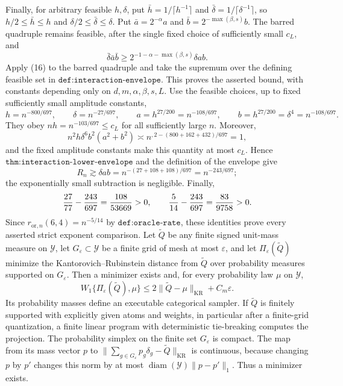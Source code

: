 Finally, for arbitrary feasible \(h,\delta\), put \(\bar h=1/\lceil h^{-1}\rceil\) and \(\bar\delta=1/\lceil\delta^{-1}\rceil\), so \(h/2\leq\bar h\leq h\) and \(\delta/2\leq\bar\delta\leq\delta\).  Put \(\bar a=2^{-\alpha}a\) and \(\bar b=2^{-\max(\beta,s)}b\).  The barred quadruple remains feasible, after the single fixed choice of sufficiently small \(c_L\), and
\[
 \bar\delta\bar a\bar b
 \geq2^{-1-\alpha-\max(\beta,s)}\delta ab.
\]
Apply (16) to the barred quadruple and take the supremum over the defining feasible set in \(\texttt{def:interaction-envelope}\).  This proves the asserted bound, with constants depending only on \(d,m,\alpha,\beta,s,L\).
Use the feasible choices, up to fixed sufficiently small amplitude constants,
\[
 h=n^{-800/697},\qquad \delta=n^{-27/697},\qquad
 a=h^{27/200}=n^{-108/697},\qquad
 b=h^{27/200}=\delta^4=n^{-108/697}.
\]
They obey \(nh=n^{-103/697}\leq c_L\) for all sufficiently large \(n\).  Moreover,
\[
 n^2h\delta^6b^2(a^2+b^2)
 \asymp n^{,2-(800+162+432)/697}=1,
\]
and the fixed amplitude constants make this quantity at most \(c_L\).  Hence \(\texttt{thm:interaction-lower-envelope}\) and the definition of the envelope give
\[
 R_n\gtrsim \delta ab=n^{-(27+108+108)/697}=n^{-243/697};
\]
the exponentially small subtraction is negligible.  Finally,
\[
 {27\over77}-{243\over697}={108\over53669}>0,
 \qquad
 {5\over14}-{243\over697}={83\over9758}>0.
\]
Since \(r_{\mathrm{or},n}(6,4)=n^{-5/14}\) by \(\texttt{def:oracle-rate}\), these identities prove every asserted strict exponent comparison.
Let \(\widetilde Q\) be any finite signed unit-mass measure on \(\mathcal Y\), let \(G_{\varepsilon}\subset\mathcal Y\) be a finite grid of mesh at most \(\varepsilon\), and let \(\Pi_{\varepsilon}(\widetilde Q)\) minimize the Kantorovich--Rubinstein distance from \(\widetilde Q\) over probability measures supported on \(G_{\varepsilon}\).  Then a minimizer exists and, for every probability law \(\mu\) on \(\mathcal Y\),
\[
 W_1\{\Pi_{\varepsilon}(\widetilde Q),\mu\}
 \leq2\lVert\widetilde Q-\mu\rVert_{\mathrm{KR}}+C_m\varepsilon.
\]
Its probability masses define an executable categorical sampler.  If \(\widetilde Q\) is finitely supported with explicitly given atoms and weights, in particular after a finite-grid quantization, a finite linear program with deterministic tie-breaking computes the projection.
The probability simplex on the finite set \(G_\varepsilon\) is compact.  The map from its mass vector \(p\) to \(\lVert\sum_{g\in G_\varepsilon}p_g\delta_g-\widetilde Q\rVert_{\mathrm{KR}}\) is continuous, because changing \(p\) by \(p'\) changes this norm by at most \(\operatorname{diam}(\mathcal Y)\lVert p-p'\rVert_1\).  Thus a minimizer exists.

